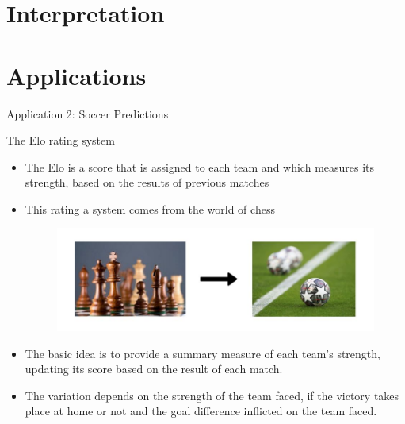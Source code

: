 \documentclass[aspectratio=169,xcolor=dvipsnames]{beamer}
\begin{document}

\section{Interpretation}


\section{Applications}

\begin{frame}{}
    \centering
    \begin{Huge}
     Application 2: Soccer Predictions
    \end{Huge}
\end{frame}

\begin{frame}{The Elo rating system}
\begin{itemize}

    \item  The Elo is a score that is assigned to each team and which measures its strength, based on the results of previous matches
    
    \item This rating a system comes from the world of chess
    
    
    \begin{figure}[ht] 
        \begin{center} 
            \includegraphics[width=12cm]{fre.jpg}\\
        \end{center} 
    \end{figure}
    
    \item The basic idea is to provide a summary measure of each team's strength, updating its score based on the result of each match.
    
    \item The variation depends on the strength of the team faced, if the victory takes place at home or not and the goal difference inflicted on the team faced.
\end{itemize}
\end{frame}
\end{document}
